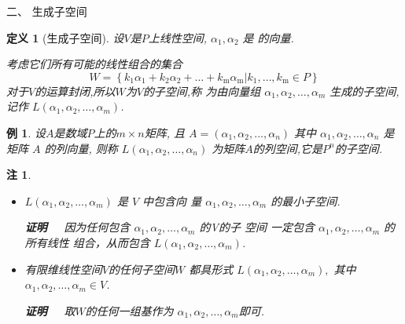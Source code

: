 \documentclass[13pt]{beamer}
\newtheorem{exa}{例}
\newtheorem*{defi}{定义}
\newtheorem*{rem}{注}
\def\pf{{\bf 证明~~ }}
\begin{document}
\begin{frame}{二、 生成子空间}
\begin{defi}[生成子空间]
设$V$是$P$上线性空间, $\alpha_{1}, \alpha_{2}$ 是 的向量. 

考虑它们所有可能的线性组合的集合
$${W}=\left\{{k}_{1} \alpha_{1}+{k}_{2} \alpha_{2}+\ldots+{k}_{\mathrm{m}} \alpha_{\mathrm{m}} | {k}_{1}, \ldots, {k}_{\mathrm{m}} \in {P}\right\}$$
对于$V$的运算封闭,所以$W$为$V$的子空间,称 为由向量组 $\alpha_{1}, \alpha_{2}, \ldots, \alpha_{m}$ 生成的子空间,记作 $L\left(\alpha_{1}, \alpha_{2}, \ldots, \alpha_{m}\right)$.
\end{defi}

\begin{exa}
	设$A$是数域$P$上的$m \times n$矩阵, 且
	$
	A=\left(\alpha_{1}, \alpha_{2}, \ldots, \alpha_{n}\right)
	$
	其中 $\alpha_{1}, \alpha_{2}, \ldots, \alpha_{n}$ 是矩阵 $A$ 的列向量, 则称
	$
	L\left(\alpha_{1}, \alpha_{2}, \ldots, \alpha_{n}\right)
	$
	为矩阵$A$的列空间,它是$P^n$的子空间.
\end{exa}
\end{frame}

\begin{frame}



\begin{rem}
	\begin{itemize}
		\item  $L \left(\alpha_{1}, \alpha_{2}, \ldots, \alpha_{m}\right)$ 是 $V$ 中包含向 量 $\alpha_{1}, \alpha_{2}, \ldots, \alpha_{m}$ 的最小子空间.
		
		\pf 因为任何包含 $\alpha_{1}, \alpha_{2}, \ldots, \alpha_{m}$ 的V的子
		空间 一定包含 $\alpha_{1}, \alpha_{2}, \ldots, \alpha_{m}$ 的所有线性
		组合，从而包含 $L \left(\alpha_{1}, \alpha_{2}, \dots, \alpha_{m}\right)$.
		\item 有限维线性空间$V$的任何子空间$W$ 都具形式 $L \left(\alpha_{1}, \alpha_{2}, \dots, \alpha_{m}\right),$ 其中
		$\alpha_{1}, \alpha_{2}, \ldots, \alpha_{m} \in {V}$.
		
		\pf  取$W$的任何一组基作为 $\alpha_{1}, \alpha_{2}, \ldots, \alpha_{m}$即可.
	\end{itemize}
\end{rem}
\end{frame}
\end{document}

